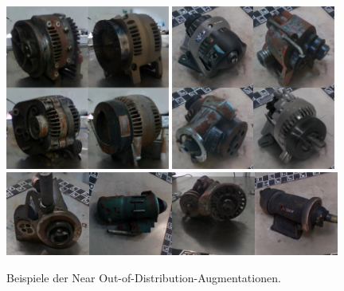 \begin{figure}[h]
  \centering
  \includegraphics[width=0.48\textwidth]{figure_results_ood-augs_good_1.png}%
  \hspace{0.02\textwidth}\includegraphics[width=0.48\textwidth]{figure_results_ood-augs_good_3.png}\vspace{0.01\textwidth}
  \includegraphics[width=0.98\textwidth]{figure_results_ood-augs_good_4.png}
  \caption{Beispiele der Near Out-of-Distribution-Augmentationen.}
  \label{fig:ood-augs-good}
\end{figure}


